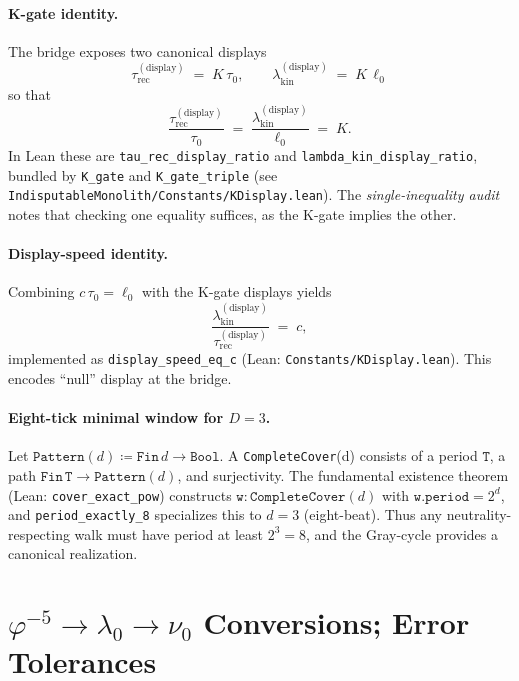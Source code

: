 \documentclass[12pt,a4paper]{article}
\begin{document}
\paragraph{K-gate identity.}
The bridge exposes two canonical displays
\[
  \tau_{\mathrm{rec}}^{(\mathrm{display})} \;=\; K\,\tau_0,
  \qquad
  \lambda_{\mathrm{kin}}^{(\mathrm{display})} \;=\; K\,\ell_0
\]
so that
\begin{equation}
  \frac{\tau_{\mathrm{rec}}^{(\mathrm{display})}}{\tau_0}
  \;=\;
  \frac{\lambda_{\mathrm{kin}}^{(\mathrm{display})}}{\ell_0}
  \;=\; K.
\end{equation}
In Lean these are \texttt{tau\_rec\_display\_ratio} and \texttt{lambda\_kin\_display\_ratio}, bundled by \texttt{K\_gate} and \texttt{K\_gate\_triple} (see \texttt{IndisputableMonolith/Constants/KDisplay.lean}). The \emph{single-inequality audit} notes that checking one equality suffices, as the K-gate implies the other.

\paragraph{Display-speed identity.}
Combining \(c\,\tau_0=\ell_0\) with the K-gate displays yields
\begin{equation}
  \frac{\lambda_{\mathrm{kin}}^{(\mathrm{display})}}
       {\tau_{\mathrm{rec}}^{(\mathrm{display})}}
  \;=\; c,
\end{equation}
implemented as \texttt{display\_speed\_eq\_c} (Lean: \texttt{Constants/KDisplay.lean}). This encodes “null” display at the bridge.

\paragraph{Eight-tick minimal window for \(D=3\).}
Let \(\texttt{Pattern}(d)\coloneqq \texttt{Fin}\,d\to\texttt{Bool}\). A \texttt{CompleteCover}(d) consists of a period \(\texttt{T}\), a path \(\texttt{Fin}\,\texttt{T}\to\texttt{Pattern}(d)\), and surjectivity. The fundamental existence theorem (Lean: \texttt{cover\_exact\_pow}) constructs \(\texttt{w}:\texttt{CompleteCover}(d)\) with \(\texttt{w.period}=2^d\), and \texttt{period\_exactly\_8} specializes this to \(d=3\) (eight-beat). Thus any neutrality-respecting walk must have period at least \(2^3=8\), and the Gray-cycle provides a canonical realization.

\section{\texorpdfstring{\(\varphi^{-5}\to \lambda_0 \to \nu_0\)}{phi^-5 -> lambda0 -> nu0} Conversions; Error Tolerances}
\label{app:phi-lambda-nu}
\end{document}
